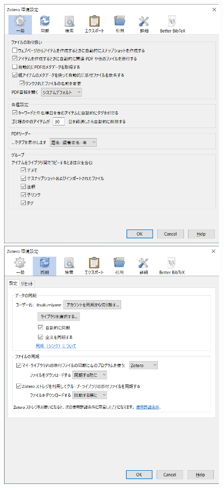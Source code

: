 \documentclass[a4paper,pdftex]{article}
\begin{document}
\begin{figure}[ht]
  \begin{minipage}[ht]{0.19\columnwidth}
    \centering
    \includegraphics[width=\columnwidth]{fig/zotero01.png}
  \end{minipage}
  \begin{minipage}[ht]{0.19\columnwidth}
    \centering
    \includegraphics[width=\columnwidth]{fig/zotero02.png}

\end{minipage}
\end{figure}
\end{document}

